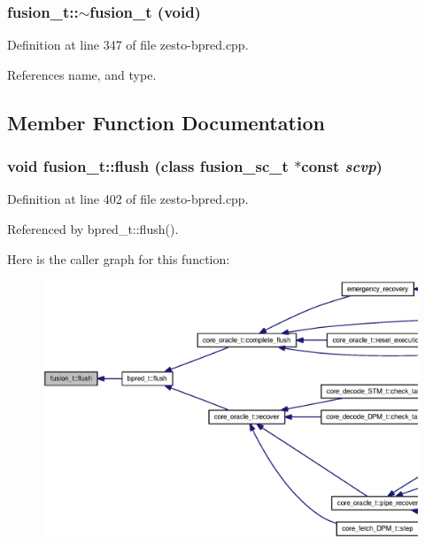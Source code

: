 \subsubsection[{$\sim$fusion\_\-t}]{\setlength{\rightskip}{0pt plus 5cm}fusion\_\-t::$\sim$fusion\_\-t (void)\hspace{0.3cm}{\tt  [virtual]}}\label{classfusion__t_a1f8e38b8c0185c3f432766095931aab}




Definition at line 347 of file zesto-bpred.cpp.

References name, and type.

\subsection{Member Function Documentation}
\subsubsection[{flush}]{\setlength{\rightskip}{0pt plus 5cm}void fusion\_\-t::flush (class {\bf fusion\_\-sc\_\-t} $\ast$const  {\em scvp})\hspace{0.3cm}{\tt  [virtual]}}\label{classfusion__t_3eb17c25f002d13bf06b4235a6215a7a}




Definition at line 402 of file zesto-bpred.cpp.

Referenced by bpred\_\-t::flush().

Here is the caller graph for this function:\nopagebreak
\begin{figure}[H]
\begin{center}
\leavevmode
\includegraphics[width=420pt]{classfusion__t_3eb17c25f002d13bf06b4235a6215a7a_icgraph}
\end{center}
\end{figure}
